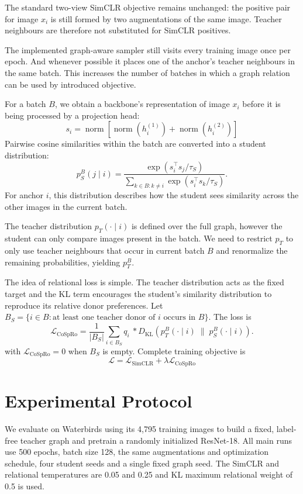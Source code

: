 \documentclass{article}
\begin{document}
The standard two-view SimCLR objective remains unchanged: the positive pair for image $x_i$ is still formed by two augmentations of the same image. Teacher neighbours are therefore not substituted for SimCLR positives. 

The implemented graph-aware sampler still visits every training image once per epoch.  And whenever possible it places one of the anchor's teacher neighbours in the same batch. This increases the number of batches in which a graph relation can be used by introduced objective.

For a batch $B$, we obtain a backbone's representation of image $x_i$ before it is being processed by a projection head:
\[
s_i=\operatorname{norm}[\operatorname{norm}(h_i^{(1)})+\operatorname{norm}(h_i^{(2)})]
\] 
Pairwise cosine similarities within the batch are converted into a student distribution:
\begin{equation}
 p_S^B(j\mid i)=\frac{\exp(s_i^\top s_j/\tau_S)}
 {\sum_{k\in B:k\ne i}\exp(s_i^\top s_k/\tau_S)}.
\end{equation}
For anchor $i$, this distribution describes how the student sees similarity across the other images in the current batch.

The teacher distribution $p_T(\cdot\mid i)$ is defined over the full graph, however the student can only compare images present in the batch. We need to restrict $p_T$ to only use teacher neighbours that occur in current batch $B$ and renormalize the remaining probabilities, yielding $p_T^B$. 

The idea of relational loss is simple. The teacher distribution acts as the fixed target and the KL term encourages the student's similarity distribution to reproduce its relative donor preferences. Let $B_S=\{i\in B:\text{at least one teacher donor of $i$ occurs in }B\}$. The loss is
\begin{equation}
\mathcal{L}_{\mathrm{CoSpRo}} =
\frac{1}{|B_S|}
\sum_{i\in B_S} q_i\ * D_{\mathrm{KL}}
\left(
p_T^B(\cdot\mid i) \;\|\; p_S^B(\cdot\mid i)
\right).
\end{equation}
with $\mathcal{L}_{\mathrm{CoSpRo}}=0$ when $B_S$ is empty. Complete training objective is
\begin{equation}
\mathcal{L} = \mathcal{L}_{\mathrm{SimCLR}} + \lambda\mathcal{L}_{\mathrm{CoSpRo}}
\end{equation}

\section{Experimental Protocol}
We evaluate on Waterbirds using its 4,795 training images to build a fixed, label-free teacher graph and pretrain a randomly initialized ResNet-18. All main runs use 500 epochs, batch size 128, the same augmentations and optimization schedule, four student seeds and a single fixed graph seed. The SimCLR and relational temperatures are 0.05 and 0.25 and KL maximum relational weight of 0.5 is used.
\end{document}
